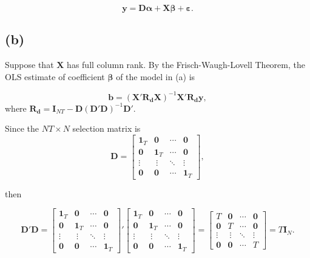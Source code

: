 \documentclass[
]{article}
\begin{document}
\[\boldsymbol{y} = \boldsymbol{D\alpha} + \boldsymbol{X}\boldsymbol{\beta} + \boldsymbol{\varepsilon}.\]

\hypertarget{b}{%
\subsection{(b)}\label{b}}

Suppose that \(\boldsymbol{X}\) has full column rank. By the
Frisch-Waugh-Lovell Theorem, the OLS estimate of coefficient
\(\boldsymbol{\beta}\) of the model in (a) is

\[\boldsymbol{b} = (\boldsymbol{X'R_dX})^{-1}\boldsymbol{X'R_dy},\]
where
\(\boldsymbol{R_d} = \boldsymbol{I}_{NT} - \boldsymbol{D}(\boldsymbol{D'D})^{-1}\boldsymbol{D}'\).

Since the \(NT \times N\) selection matrix is
\[\boldsymbol{D} = \begin{bmatrix}\boldsymbol{1}_T & \boldsymbol{0} & \cdots & \boldsymbol{0} \\ \boldsymbol{0} & \boldsymbol{1}_T & \cdots & \boldsymbol{0} \\ \vdots &\ \vdots & \ddots & \vdots \\ \boldsymbol{0} & \boldsymbol{0} & \cdots & \boldsymbol{1}_T\end{bmatrix},\]

then

\[\boldsymbol{D'D} = \begin{bmatrix}\boldsymbol{1}_T & \boldsymbol{0} & \cdots & \boldsymbol{0} \\ \boldsymbol{0} & \boldsymbol{1}_T & \cdots & \boldsymbol{0} \\ \vdots &\ \vdots & \ddots & \vdots \\ \boldsymbol{0} & \boldsymbol{0} & \cdots & \boldsymbol{1}_T\end{bmatrix}' \begin{bmatrix}\boldsymbol{1}_T & \boldsymbol{0} & \cdots & \boldsymbol{0} \\ \boldsymbol{0} & \boldsymbol{1}_T & \cdots & \boldsymbol{0} \\ \vdots &\ \vdots & \ddots & \vdots \\ \boldsymbol{0} & \boldsymbol{0} & \cdots & \boldsymbol{1}_T\end{bmatrix}=\begin{bmatrix}T & \boldsymbol{0} & \cdots & \boldsymbol{0} \\ \boldsymbol{0} & T & \cdots & \boldsymbol{0} \\ \vdots &\ \vdots & \ddots & \vdots \\ \boldsymbol{0} & \boldsymbol{0} & \cdots & T\end{bmatrix}=T\boldsymbol{I}_{N}.\]
\end{document}
